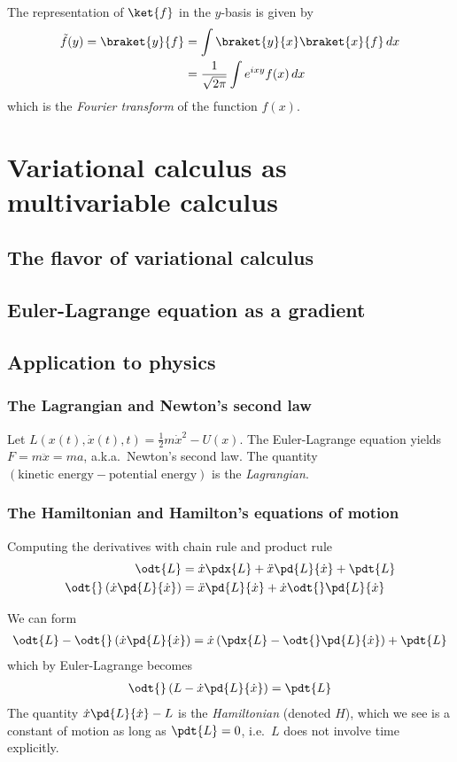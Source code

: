 \documentclass[12pt, oneside, letterpaper, fleqn]{article}
\begin{document}
The representation of $\ket{f}$ in the $y$-basis is given by
\begin{align}
\tilde{f}(y) = \braket{y}{f} &= \int
\braket{y}{x}\braket{x}{f}\,dx\nonumber\\
&= \frac{1}{\sqrt{2\pi}} \int e^{ixy} f(x)\,dx
\end{align}
which is the \emph{Fourier transform} of the function $f(x)$.

\section{Variational calculus as multivariable calculus}
\subsection{The flavor of variational calculus}


\subsection{Euler-Lagrange equation as a gradient}


\subsection{Application to physics}
\subsubsection{The Lagrangian and Newton's second law}
Let $L(x(t), \dot{x}(t), t) = \frac{1}{2}m\dot{x}^2 - U(x)$. The
Euler-Lagrange equation yields $F = m\ddot{x} = ma$, a.k.a.\ Newton's
second law. The quantity $(\text{kinetic energy} - \text{potential
energy})$ is the \emph{Lagrangian}.

\subsubsection{The Hamiltonian and Hamilton's equations of motion}
Computing the derivatives with chain rule and product rule
\begin{align*}
\odt{L} &= \dot{x}\pdx{L} + \ddot{x}\pd{L}{\dot{x}} + \pdt{L}\\
\odt{}\left(\dot{x}\pd{L}{\dot{x}}\right) &= \ddot{x}\pd{L}{\dot{x}} +
\dot{x}\odt{}\pd{L}{\dot{x}}
\end{align*}

We can form
\begin{align*}
\odt{L} - \odt{}\left(\dot{x}\pd{L}{\dot{x}}\right) =
\dot{x}\left(\pdx{L} - \odt{}\pd{L}{\dot{x}}\right) + \pdt{L}
\end{align*}
which by Euler-Lagrange becomes
\begin{align*}
\odt{}\left(L - \dot{x}\pd{L}{\dot{x}}\right) = \pdt{L}
\end{align*}
The quantity $\dot{x}\pd{L}{\dot{x}} - L$ is the
\emph{Hamiltonian} (denoted $H$), which we see is a constant of motion
as long as $\pdt{L} = 0$, i.e.\ $L$ does not involve time explicitly.
\end{document}
